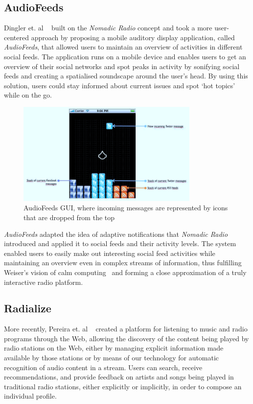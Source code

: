 \subsection{AudioFeeds}

Dingler et. al ~\cite{Dingler2010} built on the \textit{Nomadic Radio} concept and took a more user-centered approach by proposing a mobile auditory display application, called \textit{AudioFeeds}, that allowed users to maintain an overview of activities in different social feeds. The application runs on a mobile device and enables users to get an overview of their social networks and spot peaks in activity by sonifying social feeds and creating a spatialised soundscape around the user’s head. By using this solution, users could stay informed about current issues and spot ‘hot topics’ while on the go. 

\begin{figure}[h]
\centering
\includegraphics[width=0.8\textwidth]{./Images/audiofeeds.png}
\caption{AudioFeeds GUI, where incoming messages are represented by icons that are dropped from the top}
\label{fig:test_env}
\end{figure}

\textit{AudioFeeds} adapted the idea of adaptive notifications that \textit{Nomadic Radio} introduced and applied it to social feeds and their activity levels. The system enabled users to easily make out interesting social feed activities while maintaining an overview even in complex streams of information, thus fulfilling Weiser’s vision of calm computing~\cite{Weiser1997} and forming a close approximation of a truly interactive radio platform.


\subsection{Radialize}

More recently, Pereira et. al ~\cite{Pereira2013} created a platform for listening to music and radio programs through the Web, allowing the discovery of the content being played by radio stations on the Web, either by managing explicit information made available by those stations or by means of our technology for automatic recognition of audio content in a stream. Users can search, receive recommendations, and provide feedback on artists and songs being played in traditional radio stations, either explicitly or implicitly, in order to compose an individual profile.

